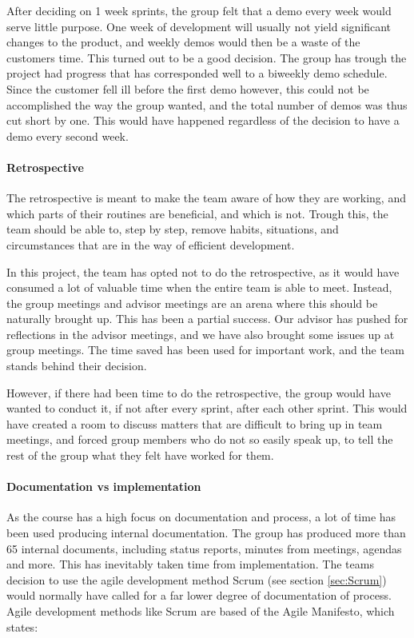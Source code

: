 \documentclass[11pt,a4paper,titlepage,oneside]{report}
\begin{document}
After deciding on 1 week sprints, the group felt that a demo every week would serve little purpose. One week of development will usually not yield significant changes to the product, and weekly demos would then be a waste of the customers time. This turned out to be a good decision. The group has trough the project had progress that has corresponded well to a biweekly demo schedule. Since the customer fell ill before the first demo however, this could not be accomplished the way the group wanted, and the total number of demos was thus cut short by one. This would have happened regardless of the decision to have a demo every second week.

\paragraph{Retrospective}
The retrospective is meant to make the team aware of how they are working, and which parts of their routines are beneficial, and which is not. Trough this, the team should be able to, step by step, remove habits, situations, and circumstances that are in the way of efficient development.

In this project, the team has opted not to do the retrospective, as it would have consumed a lot of valuable time when the entire team is able to meet. Instead, the group meetings and advisor meetings are an arena where this should be naturally brought up. This has been a partial success. Our advisor has pushed for reflections in the advisor meetings, and we have also brought some issues up at group meetings. The time saved has been used for important work, and the team stands behind their decision. 

However, if there had been time to do the retrospective, the group would have wanted to conduct it, if not after every sprint, after each other sprint. This would have created a room to discuss matters that are difficult to bring up in team meetings, and forced group members who do not so easily speak up, to tell the rest of the group what they felt have worked for them.

\paragraph{Documentation vs implementation}
As the course has a high focus on documentation and process, a lot of time has been used producing internal documentation. The group has produced more than 65 internal documents, including status reports, minutes from meetings, agendas and more. This has inevitably taken time from implementation. The teams decision to use the agile development method Scrum (see section \ref{sec:Scrum}) would normally have called for a far lower degree of documentation of process. Agile development methods like Scrum are based of the Agile Manifesto, which states:
\end{document}
